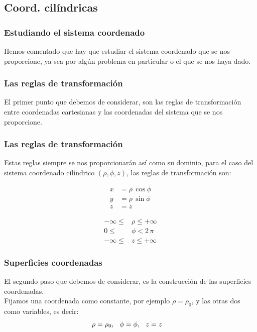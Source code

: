 \documentclass[12pt]{beamer}
\begin{document}
\subsection{Coord. cilíndricas}

\begin{frame}
\frametitle{Estudiando el sistema coordenado}
Hemos comentado que hay que estudiar el sistema coordenado que se nos proporcione, ya sea por algún problema en particular o el que se nos haya dado.
\end{frame}
\begin{frame}
\frametitle{Las reglas de transformación}
El primer punto que debemos de considerar, son las reglas de transformación entre coordenadas cartesianas y las coordenadas del sistema que se nos proporcione.
\end{frame}
\begin{frame}
\frametitle{Las reglas de transformación}
Estas reglas siempre se nos proporcionarán así como su dominio, \pause para el caso del sistema coordenado cilíndrico $(\rho, \phi, z)$, las reglas de transformación son:
\pause
\begin{minipage}[t]{0.4\linewidth}
\begin{align*}
x &= \rho \, \cos \phi \\[0.5em]
y &= \rho \, \sin \phi \\[0.5em]
z &= z
\end{align*}
\end{minipage}
\begin{minipage}[t]{0.4\linewidth}
\begin{align*}
   -\infty \leq &\rho \leq +\infty \\[0.5em]
   0 \leq &\phi < 2 \, \pi \\[0.5em]
   -\infty \leq &z \leq +\infty
\end{align*}
\end{minipage}
\end{frame}
\begin{frame}
\frametitle{Superficies coordenadas}
El segundo paso que debemos de considerar, es la construcción de las superficies coordenadas.
\\
\bigskip
\pause
Fijamos una coordenada como constante, por ejemplo $\rho = \rho_{0}$, y las otras dos como variables, es decir:
\begin{align*}
\rho &= \rho_{0}, \hspace{0.25cm} \phi = \phi, \hspace{0.25cm} z = z
\end{align*}
\end{frame}
\end{document}
